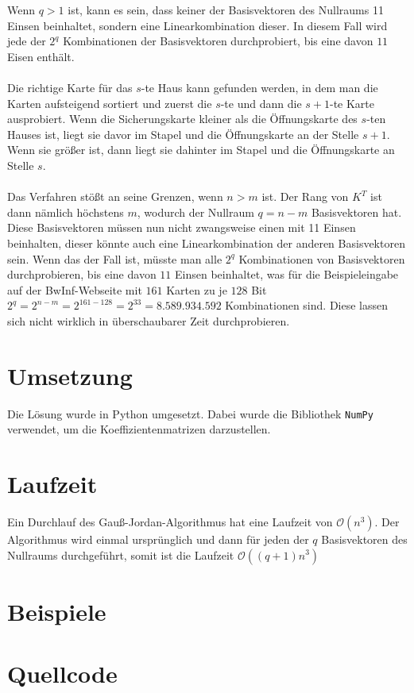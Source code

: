 \documentclass[a4paper,10pt,ngerman]{scrartcl}
\begin{document}
Wenn $q>1$ ist, kann es sein, dass keiner der Basisvektoren des Nullraums 11 Einsen beinhaltet, sondern eine Linearkombination dieser. In diesem Fall wird jede der $2^q$ Kombinationen der Basisvektoren durchprobiert, bis eine davon $11$ Eisen enthält.\\\\
Die richtige Karte für das $s$-te Haus kann gefunden werden, in dem man die Karten aufsteigend sortiert und zuerst die $s$-te und dann die $s+1$-te Karte ausprobiert. Wenn die Sicherungskarte kleiner als die Öffnungskarte des $s$-ten Hauses ist, liegt sie davor im Stapel und die Öffnungskarte an der Stelle $s+1$. Wenn sie größer ist, dann liegt sie dahinter im Stapel und die Öffnungskarte an Stelle $s$.\\
\\
Das Verfahren stößt an seine Grenzen, wenn $n>m$ ist. Der Rang von $K^T$ ist dann nämlich höchstens $m$, wodurch der Nullraum $q=n-m$ Basisvektoren hat. Diese Basisvektoren müssen nun nicht zwangsweise einen mit 11 Einsen beinhalten, dieser könnte auch eine Linearkombination der anderen Basisvektoren sein. Wenn das der Fall ist, müsste man alle $2^q$ Kombinationen von Basisvektoren durchprobieren, bis eine davon $11$ Einsen beinhaltet, was für die Beispieleingabe auf der BwInf-Webseite mit $161$ Karten zu je $128$ Bit $2^q=2^{n-m}=2^{161-128}=2^{33}=8.589.934.592$ Kombinationen sind. Diese lassen sich nicht wirklich in überschaubarer Zeit durchprobieren.
\section{Umsetzung}
Die Lösung wurde in Python umgesetzt. Dabei wurde die Bibliothek \lstinline|NumPy| verwendet, um die Koeffizientenmatrizen darzustellen. 
\section{Laufzeit}
Ein Durchlauf des Gauß-Jordan-Algorithmus hat eine Laufzeit von $\mathcal{O}(n^3)$. Der Algorithmus wird einmal ursprünglich und dann für jeden der $q$ Basisvektoren des Nullraums durchgeführt, somit ist die Laufzeit $\mathcal{O}((q+1)n^3)$
\section{Beispiele}

\section{Quellcode}


\end{document}

